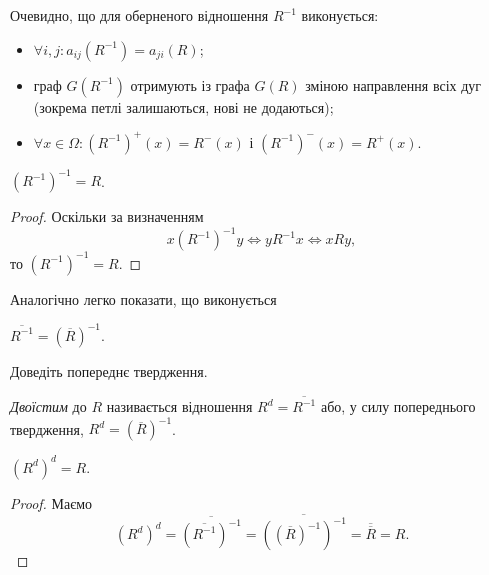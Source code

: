 \begin{properties}
	Очевидно, що для оберненого відношення $R^{-1}$ виконується:
	\begin{itemize}
		\item $\forall i, j: a_{ij} (R^{-1}) = a_{ji} (R)$;
		\item граф $G(R^{-1})$ отримують із графа $G(R)$ зміною направлення всіх дуг (зокрема петлі залишаються, нові не додаються);
		\item $\forall x \in \Omega: (R^{-1})^+(x) = R^-(x)$ і $(R^{-1})^-(x) = R^+(x)$.
	\end{itemize}
\end{properties}

\begin{proposition}
	$\left(R^{-1}\right)^{-1} = R$.
\end{proposition}

\begin{proof}
	Оскільки за визначенням \begin{equation} x \left(R^{-1}\right)^{-1} y \iff y R^{-1} x \iff x R y,\end{equation} то $\left(R^{-1}\right)^{-1} = R$.
\end{proof}

Аналогічно легко показати, що виконується
\begin{proposition}
	$\overline{R^{-1}} = (\overline{R})^{-1}$.
\end{proposition}

\begin{exercise}
	Доведіть попереднє твердження.
\end{exercise}

\begin{definition}
	\textit{Двоїстим} до $R$ називається відношення $R^d = \overline{R^{-1}}$ або, у силу попереднього твердження, $R^d = \left(\overline{R}\right)^{-1}$.
\end{definition}

\begin{proposition}
	$\left(R^d\right)^d = R$.
\end{proposition}

\begin{proof}
	Маємо \begin{equation}\left(R^d\right)^d = \overline{\left(\overline{R^{-1}}\right)^{-1}} = \overline{\left(\left(\overline{R}\right)^{-1}\right)^{-1}} = \overline{\overline{R}} = R.\end{equation}
\end{proof}

